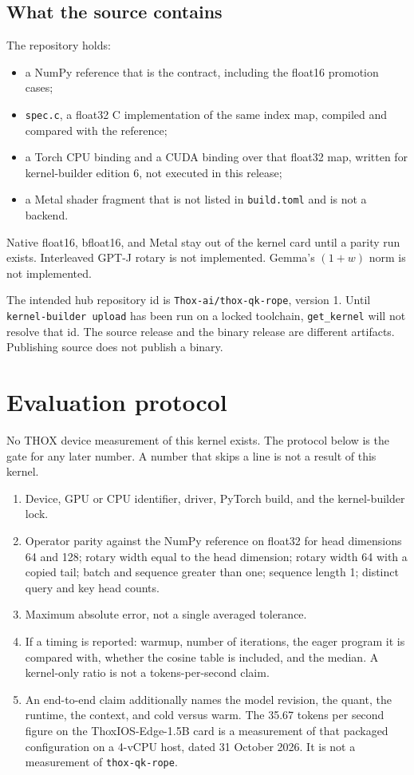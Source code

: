 \documentclass[11pt]{article}
\begin{document}
\subsection{What the source contains}

The repository holds:

\begin{itemize}
\item a NumPy reference that is the contract, including the float16 promotion cases;
\item \texttt{spec.c}, a float32 C implementation of the same index map, compiled and compared with the reference;
\item a Torch CPU binding and a CUDA binding over that float32 map, written for kernel-builder edition 6, not executed in this release;
\item a Metal shader fragment that is not listed in \texttt{build.toml} and is not a backend.
\end{itemize}

Native float16, bfloat16, and Metal stay out of the kernel card until a parity run exists. Interleaved GPT-J rotary is not implemented. Gemma's \((1+w)\) norm is not implemented.

The intended hub repository id is \texttt{Thox-ai/thox-qk-rope}, version 1. Until \texttt{kernel-builder upload} has been run on a locked toolchain, \texttt{get\_kernel} will not resolve that id. The source release and the binary release are different artifacts. Publishing source does not publish a binary.

\section{Evaluation protocol}

No THOX device measurement of this kernel exists. The protocol below is the gate for any later number. A number that skips a line is not a result of this kernel.

\begin{enumerate}
\item Device, GPU or CPU identifier, driver, PyTorch build, and the kernel-builder lock.
\item Operator parity against the NumPy reference on float32 for head dimensions 64 and 128; rotary width equal to the head dimension; rotary width 64 with a copied tail; batch and sequence greater than one; sequence length 1; distinct query and key head counts.
\item Maximum absolute error, not a single averaged tolerance.
\item If a timing is reported: warmup, number of iterations, the eager program it is compared with, whether the cosine table is included, and the median. A kernel-only ratio is not a tokens-per-second claim.
\item An end-to-end claim additionally names the model revision, the quant, the runtime, the context, and cold versus warm. The 35.67 tokens per second figure on the ThoxIOS-Edge-1.5B card is a measurement of that packaged configuration on a 4-vCPU host, dated 31 October 2026. It is not a measurement of \texttt{thox-qk-rope}.
\end{enumerate}
\end{document}
